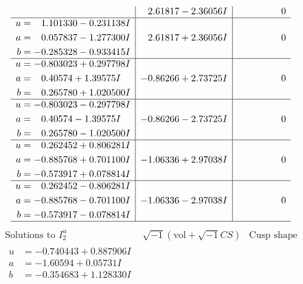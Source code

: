 \documentclass[1p]{elsarticle_modified}
\theoremstyle{definition}
\newcommand{\I}{\sqrt{-1}}
\begin{document}
$$\begin{array}{c|c|c}
 & \phantom{-}2.61817 - 2.36056 I & \phantom{-0.000000 } 0 \\ \hline\begin{aligned}
u &= \phantom{-}1.101330 - 0.231138 I \\
a &= \phantom{-}0.057837 - 1.277300 I \\
b &= -0.285328 - 0.933415 I\end{aligned}
 & \phantom{-}2.61817 + 2.36056 I & \phantom{-0.000000 } 0 \\ \hline\begin{aligned}
u &= -0.803023 + 0.297798 I \\
a &= \phantom{-}0.40574 + 1.39575 I \\
b &= \phantom{-}0.265780 + 1.020500 I\end{aligned}
 & -0.86266 + 2.73725 I & \phantom{-0.000000 } 0 \\ \hline\begin{aligned}
u &= -0.803023 - 0.297798 I \\
a &= \phantom{-}0.40574 - 1.39575 I \\
b &= \phantom{-}0.265780 - 1.020500 I\end{aligned}
 & -0.86266 - 2.73725 I & \phantom{-0.000000 } 0 \\ \hline\begin{aligned}
u &= \phantom{-}0.262452 + 0.806281 I \\
a &= -0.885768 + 0.701100 I \\
b &= -0.573917 + 0.078814 I\end{aligned}
 & -1.06336 + 2.97038 I & \phantom{-0.000000 } 0 \\ \hline\begin{aligned}
u &= \phantom{-}0.262452 - 0.806281 I \\
a &= -0.885768 - 0.701100 I \\
b &= -0.573917 - 0.078814 I\end{aligned}
 & -1.06336 - 2.97038 I & \phantom{-0.000000 } 0\\
 \hline 
 \end{array}$$\newpage$$\begin{array}{c|c|c}  
\text{Solutions to }I^u_{2}& \I (\text{vol} + \sqrt{-1}CS) & \text{Cusp shape}\\
 \hline 
\begin{aligned}
u &= -0.740443 + 0.887906 I \\
a &= -1.60594 + 0.05731 I \\
b &= -0.354683 + 1.128330 I\end{aligned}

\end{array}$$
\end{document}
